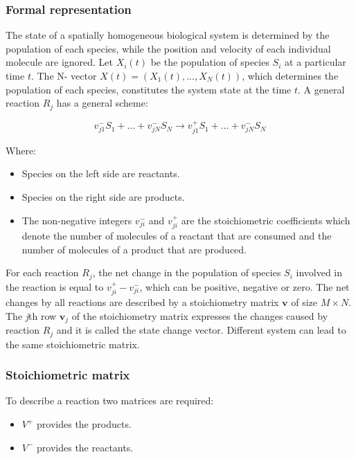     \subsubsection{Formal representation}
    The state of a spatially homogeneous biological system is determined by the population of each species, while the position and velocity of each individual molecule are ignored.
    Let $X_i(t)$ be the population of species $S_i$ at a particular time $t$.
    The N- vector $X(t) = (X_1(t),...,X_N(t))$, which determines the population of each species, constitutes the system state at the time $t$.
    A general reaction $R_j$ has a general scheme:

    $$v^-_{j1}S_1+...+v^-_{jN}S_N \rightarrow v^+_{j1}S_1+...+v^-_{jN}S_N$$

    Where:

    \begin{multicols}{2}
      \begin{itemize}
        \item Species on the left side are reactants.
        \item Species on the right side are products.
        \item The non-negative integers $v^-_{ji}$ and $v^+_{ji}$ are the stoichiometric coefficients which denote the number of molecules of a reactant that are consumed and the number of molecules of a product that are produced.
      \end{itemize}
    \end{multicols}

    For each reaction $R_j$, the net change in the population of species $S_i$ involved in the reaction is equal to $v^+_{ji}- v^-_{ji}$, which can be positive, negative or zero.
    The net changes by all reactions are described by a stoichiometry matrix $\mathbf{v}$ of size $M × N$.
    The \emph{j}th row $\mathbf{v}_j$ of the stoichiometry matrix expresses the changes caused by reaction $R_j$ and it is called the state change vector.
    Different system can lead to the same stoichiometric matrix.

    \subsubsection{Stoichiometric matrix}
    To describe a reaction two matrices are required:

    \begin{multicols}{2}
      \begin{itemize}
        \item $V^+$ provides the products.
        \item $V^-$ provides the reactants.
      \end{itemize}
    \end{multicols}

